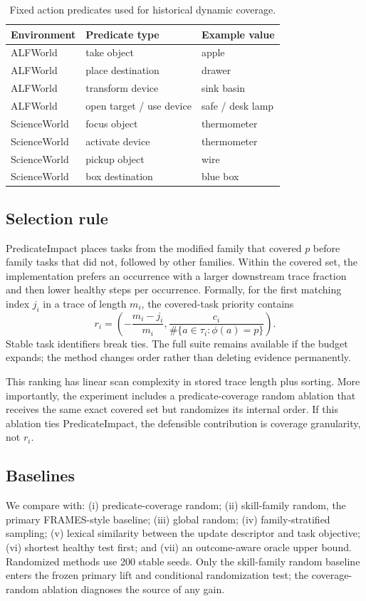 \documentclass[10pt]{article}
\begin{document}
\begin{table}[t]
\centering
\caption{Fixed action predicates used for historical dynamic coverage.}
\label{tab:predicates}
\begin{tabular}{lll}
\toprule
Environment & Predicate type & Example value \\
\midrule
ALFWorld & take object & apple \\
ALFWorld & place destination & drawer \\
ALFWorld & transform device & sink basin \\
ALFWorld & open target / use device & safe / desk lamp \\
ScienceWorld & focus object & thermometer \\
ScienceWorld & activate device & thermometer \\
ScienceWorld & pickup object & wire \\
ScienceWorld & box destination & blue box \\
\bottomrule
\end{tabular}
\end{table}

\subsection{Selection rule}
PredicateImpact places tasks from the modified family that covered $p$ before family tasks that did not, followed by other families. Within the covered set, the implementation prefers an occurrence with a larger downstream trace fraction and then lower healthy steps per occurrence. Formally, for the first matching index $j_i$ in a trace of length $m_i$, the covered-task priority contains
\begin{equation}
 r_i=\left(-\frac{m_i-j_i}{m_i},\frac{c_i}{\#\{a\in\tau_i:\phi(a)=p\}}\right).
\end{equation}
Stable task identifiers break ties. The full suite remains available if the budget expands; the method changes order rather than deleting evidence permanently.

This ranking has linear scan complexity in stored trace length plus sorting. More importantly, the experiment includes a predicate-coverage random ablation that receives the same exact covered set but randomizes its internal order. If this ablation ties PredicateImpact, the defensible contribution is coverage granularity, not $r_i$.

\subsection{Baselines}
We compare with: (i) predicate-coverage random; (ii) skill-family random, the primary FRAMES-style baseline; (iii) global random; (iv) family-stratified sampling; (v) lexical similarity between the update descriptor and task objective; (vi) shortest healthy test first; and (vii) an outcome-aware oracle upper bound. Randomized methods use 200 stable seeds. Only the skill-family random baseline enters the frozen primary lift and conditional randomization test; the coverage-random ablation diagnoses the source of any gain.
\end{document}
